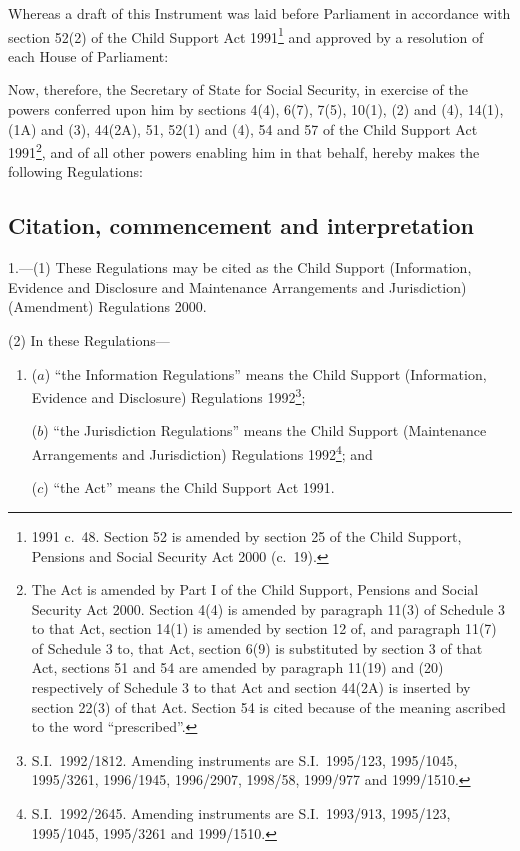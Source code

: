 \documentclass[12pt,a4paper]{article}
\title{\regstitle}
\author{S.I.\ 2001 No.\ 161}
\date{Made
18th January 2001\\
Coming into force
as provided in regulation 1(3)
}
\begin{document}
\maketitle

\noindent
Whereas a draft of this Instrument was laid before Parliament in accordance with section 52(2) of the Child Support Act 1991\footnote{1991 c.\ 48. Section 52 is amended by section 25 of the Child Support, Pensions and Social Security Act 2000 (c.\ 19).} and approved by a resolution of each House of Parliament:

Now, therefore, the Secretary of State for Social Security, in exercise of the powers conferred upon him by sections 4(4), 6(7), 7(5), 10(1), (2) and (4), 14(1), (1A) and (3), 44(2A), 51, 52(1) and (4), 54 and 57 of the Child Support Act 1991\footnote{The Act is amended by Part I of the Child Support, Pensions and Social Security Act 2000. Section 4(4) is amended by paragraph 11(3) of Schedule 3 to that Act, section 14(1) is amended by section 12 of, and paragraph 11(7) of Schedule 3 to, that Act, section 6(9) is substituted by section 3 of that Act, sections 51 and 54 are amended by paragraph 11(19) and (20) respectively of Schedule 3 to that Act and section 44(2A) is inserted by section 22(3) of that Act. Section 54 is cited because of the meaning ascribed to the word “prescribed”.}, and of all other powers enabling him in that behalf, hereby makes the following Regulations: 

{\sloppy

\tableofcontents

}

\bigskip

\setcounter{secnumdepth}{-2}

\subsection[1. Citation, commencement and interpretation]{Citation, commencement and interpretation}

1.---(1)  These Regulations may be cited as the Child Support (Information, Evidence and Disclosure and Maintenance Arrangements and Jurisdiction) (Amendment) Regulations 2000.

(2) In these Regulations—
\begin{enumerate}\item[]
($a$) “the Information Regulations” means the Child Support (Information, Evidence and Disclosure) Regulations 1992\footnote{S.I.\ 1992/1812. Amending instruments are S.I.\ 1995/123, 1995/1045, 1995/3261, 1996/1945, 1996/2907, 1998/58, 1999/977 and 1999/1510.};

($b$) “the Jurisdiction Regulations” means the Child Support (Maintenance Arrangements and Jurisdiction) Regulations 1992\footnote{S.I.\ 1992/2645. Amending instruments are S.I.\ 1993/913, 1995/123, 1995/1045, 1995/3261 and 1999/1510.}; and

($c$) “the Act” means the Child Support Act 1991.
\end{enumerate}
\end{document}

